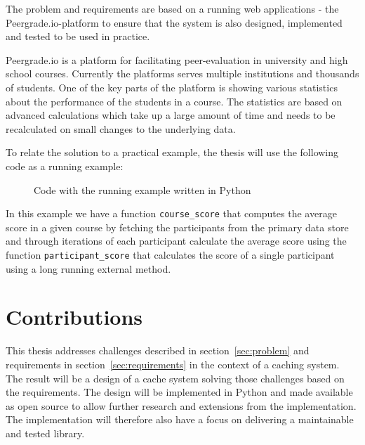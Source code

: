 The problem and requirements are based on a running web applications - the Peergrade.io-platform to ensure that the system is also designed, implemented and tested to be used in practice.

Peergrade.io is a platform for facilitating peer-evaluation in university and high school courses. Currently the platforms serves multiple institutions and thousands of students. One of the key parts of the platform is showing various statistics about the performance of the students in a course. The statistics are based on advanced calculations which take up a large amount of time and needs to be recalculated on small changes to the underlying data.

To relate the solution to a practical example, the thesis will use the following code as a running example:

\begin{figure*}[ht!]
  
  \caption{Code with the running example written in Python}
  \label{code:running-example}
\end{figure*}

In this example we have a function \verb$course_score$ that computes the average score in a given course by fetching the participants from the primary data store and through iterations of each participant calculate the average score using the function \verb$participant_score$ that calculates the score of a single participant using a long running external method.



\section{Contributions}
\label{sec:contributions}

This thesis addresses challenges described in section~\ref{sec:problem} and requirements in section~\ref{sec:requirements} in the context of a caching system. The result will be a design of a cache system solving those challenges based on the requirements. The design will be implemented in Python  and made available as open source to allow further research and extensions from the implementation. The implementation will therefore also have a focus on delivering a maintainable and tested library.


